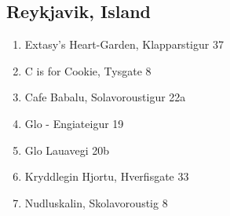\subsection{Reykjavik, Island}
\begin{enumerate}
	\item Extasy's Heart-Garden, Klapparstigur 37
	\item C is for Cookie, Tysgate 8
	\item Cafe Babalu, Solavoroustigur 22a
	\item Glo - Engiateigur 19
	\item Glo Lauavegi 20b
	\item Kryddlegin Hjortu, Hverfisgate 33
	\item Nudluskalin, Skolavoroustig 8
\end{enumerate}

